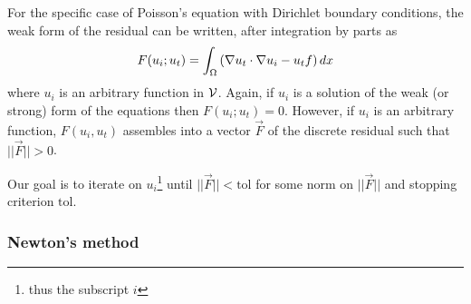 For the specific case of Poisson's equation with Dirichlet boundary conditions,
the weak form of the residual can be written, after integration by
parts as
\begin{equation}
  F(u_{i};u_{t}) = \int_{\Omega}
  \left(
    \nabla u_{t}\cdot\nabla u_{i} - u_{t}f
  \right)dx
\end{equation}
where $u_{i}$ is an arbitrary function in $\mathcal{V}$.   Again, if
$u_{i}$ is a solution of the weak (or strong) form of the equations
then $F(u_{i};u_{t})=0$.  However, if  $u_{i}$ is an arbitrary
function, $F(u_{i},u_{t})$ assembles into a vector $\vec{F}$ of the
discrete residual such that $||\vec{F}||>0$.  

Our goal is to iterate on $u_{i}$\footnote{thus the subscript
$i$} until $||\vec{F}||<\mathrm{tol}$ for some norm on $||\vec{F}||$ and stopping
criterion $\mathrm{tol}$.

\subsubsection{Newton's method}
\label{sec:newtons-method}

